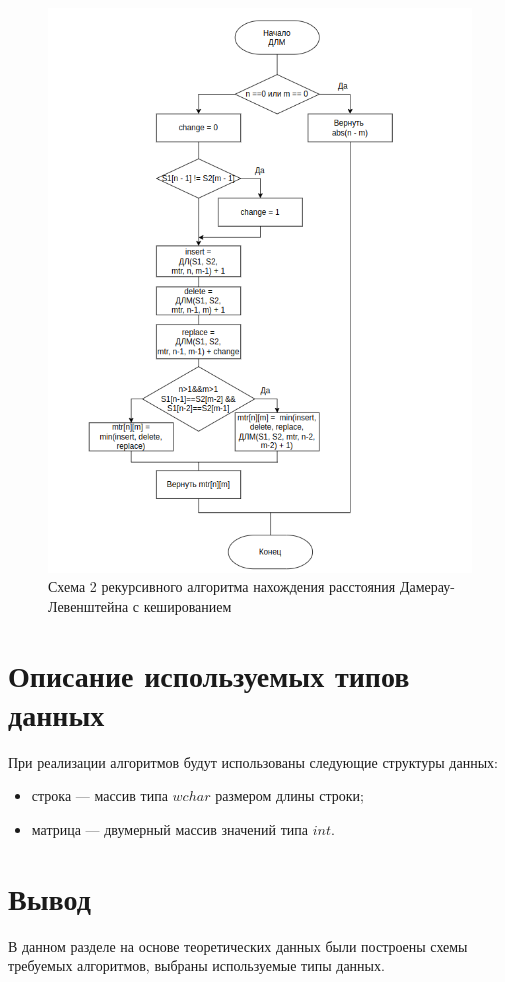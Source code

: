 \begin{figure}[h]
	\centering
	\includegraphics[width=\textwidth]{img/dlrechash2.png}
	\caption{Схема 2 рекурсивного алгоритма нахождения расстояния Дамерау-Левенштейна с кешированием}
	\label{fig:DLrechash2}
\end{figure}

\clearpage

\section{Описание используемых типов данных}

При реализации алгоритмов будут использованы следующие структуры данных:

\begin{itemize}
	\item строка --- массив типа $wchar$ размером длины строки;
	\item матрица --- двумерный массив значений типа $int$.
\end{itemize}

\section*{Вывод}

В данном разделе на основе теоретических данных были построены схемы
требуемых алгоритмов, выбраны используемые типы данных.
